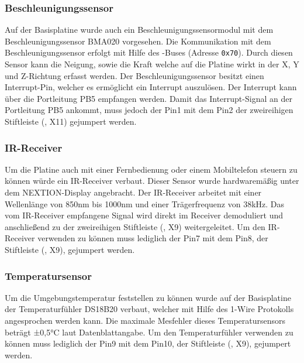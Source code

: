 
\subsubsection{Beschleunigungssensor}
Auf der \gls{Basisplatine} wurde auch ein Beschleunigungssensormodul mit dem Beschleunigungssensor BMA020 vorgesehen. Die Kommunikation mit dem Beschleunigungssensor erfolgt mit Hilfe des \IIC{}-Buses (Adresse \texttt{0x70}). Durch diesen Sensor kann die Neigung, sowie die Kraft welche auf die Platine wirkt in der X, Y und Z-Richtung erfasst werden. Der Beschleunigungssensor besitzt einen Interrupt-Pin, welcher es ermöglicht ein Interrupt auszulösen. Der Interrupt kann über die Portleitung PB5 empfangen werden. Damit das Interrupt-Signal an der Portleitung PB5 ankommt, muss jedoch der Pin1 mit dem Pin2 der zweireihigen Stiftleiste (, X11) gejumpert werden.


\subsubsection{IR-Receiver}
Um die Platine auch mit einer Fernbedienung oder einem Mobiltelefon steuern zu können würde ein IR-Receiver verbaut. Dieser Sensor wurde hardwaremäßig unter dem NEXTION-Display angebracht. Der IR-Receiver arbeitet mit einer Wellenlänge von 850nm bis 1000nm und einer Trägerfrequenz von 38kHz. Das vom IR-Receiver empfangene Signal wird direkt im Receiver demoduliert und anschließend zu der zweireihigen Stiftleiste (, X9) weitergeleitet. Um den IR-Receiver verwenden zu können muss lediglich der Pin7 mit dem Pin8, der Stiftleiste (, X9), gejumpert werden.


\subsubsection{Temperatursensor}
Um die Umgebungstemperatur feststellen zu können wurde auf der Basisplatine der Temperaturfühler DS18B20 verbaut, welcher mit Hilfe des 1-Wire Protokolls angesprochen werden kann. Die maximale Mesfehler dieses Temperatursensors beträgt ±0,5°C laut Datenblattangabe. Um den Temperaturfühler verwenden zu können muss lediglich der Pin9 mit dem Pin10, der Stiftleiste (, X9), gejumpert werden. 

